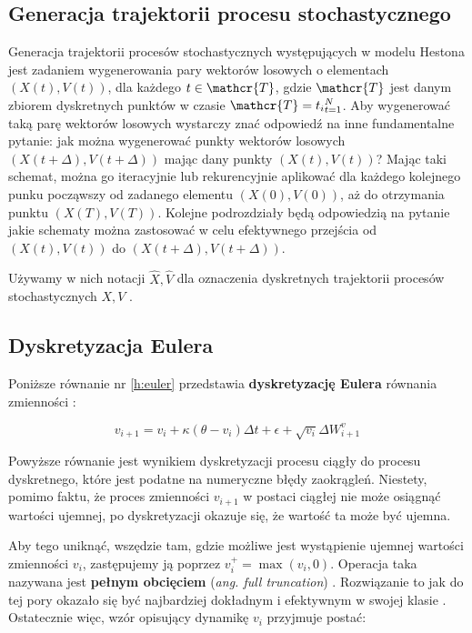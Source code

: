 \documentclass{pracamgr}
\begin{document}
{\subsection{Generacja trajektorii procesu stochastycznego}
Generacja trajektorii procesów stochastycznych występujących w modelu Hestona jest zadaniem wygenerowania pary wektorów 
losowych o elementach $(X(t), V(t))$, dla każdego $t \in \mathcr{T}$, gdzie $\mathcr{T}$ jest danym zbiorem dyskretnych punktów w czasie $\mathcr{T}  = {t_i}^N_{t=1}$. Aby wygenerować taką parę wektorów losowych wystarczy znać odpowiedź na inne fundamentalne pytanie: jak można wygenerować punkty wektorów losowych $(X(t+ \Delta), V(t+ \Delta))$
mając dany punkty $(X(t), V(t))$? Mając taki schemat, można go iteracyjnie lub rekurencyjnie aplikować dla każdego kolejnego punku począwszy od zadanego elementu $(X(0), V(0))$, aż do otrzymania punktu $(X(T), V(T))$.
Kolejne podrozdziały będą odpowiedzią na pytanie jakie schematy można zastosować w celu efektywnego przejścia od $(X(t), V(t))$ do $(X(t+ \Delta), V(t+ \Delta))$.

Używamy w nich notacji $\hat{X}, \hat{V}$ dla oznaczenia dyskretnych trajektorii procesów stochastycznych $X, V$ .

\subsection{Dyskretyzacja Eulera}

Poniższe równanie nr \ref{h:euler} przedstawia \textbf{dyskretyzację Eulera} równania zmienności \cite{Broadie}:
 
\begin{equation}\label{h:euler}
v_{i+1}  = v_i + \kappa (\theta - v_i) \Delta t + \epsilon +  \sqrt{v_i} \Delta W^{v}_{i+1}
\end{equation}

Powyższe równanie jest wynikiem dyskretyzacji procesu ciągły do procesu dyskretnego, które jest
podatne na numeryczne błędy zaokrągleń. Niestety, pomimo faktu, że proces zmienności $v_{i+1}$ w postaci ciągłej nie może osiągnąć wartości ujemnej, po dyskretyzacji okazuje się, że wartość ta może być ujemna. 

Aby tego uniknąć, wszędzie tam, gdzie możliwe jest wystąpienie ujemnej 
wartości zmienności $v_i$, zastępujemy ją poprzez $v_i^+ = \max(v_i, 0)$. Operacja taka nazywana jest \textbf{pełnym obcięciem} (\textit{ang.
full truncation}) \cite{Lord}. Rozwiązanie to jak do tej pory okazało się być najbardziej 
dokładnym i efektywnym w swojej klasie \cite{Malham}. Ostatecznie więc, wzór
opisujący dynamikę $v_i$ przyjmuje postać:

}
\end{document}
